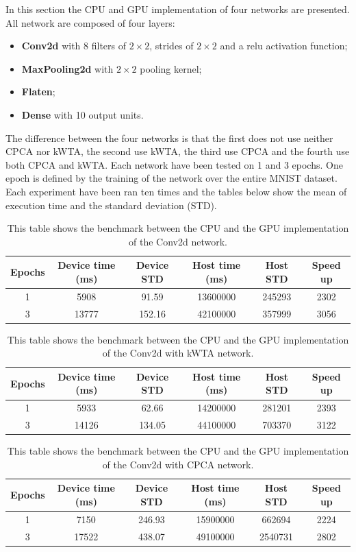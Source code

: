 \documentclass[11pt]{report}
\begin{document}
In this section the CPU and GPU implementation of four networks are presented. All network are composed of four layers:

\begin{itemize}
	\item \textbf{Conv2d} with 8 filters of $2\times2$, strides of $2\times2$ and a relu activation function;
	\item \textbf{MaxPooling2d} with $2\times2$ pooling kernel;
	\item \textbf{Flaten};
	\item \textbf{Dense} with 10 output units.
\end{itemize}

\noindent The difference between the four networks is that the first does not use neither CPCA nor kWTA, the second use kWTA, the third use CPCA and the fourth use both CPCA and kWTA. Each network have been tested on 1 and 3 epochs. One epoch is defined by the training of the network over the entire MNIST dataset. Each experiment have been ran ten times and the tables below show the mean of execution time and the standard deviation (STD).

\begin{table}[h!]
\centering
\begin{tabular}{ c c c c c c }
Epochs & Device time (ms) & Device STD & Host time (ms) & Host STD & Speed up\\
\hline
1 & 5908  & 91.59  & 13600000 & 245293 & 2302 \\
3 & 13777 & 152.16 & 42100000 & 357999 & 3056
\end{tabular}
\caption[Speed benchmark: Conv2d network]{This table shows the benchmark between the CPU and the GPU implementation of the Conv2d network.}
\end{table}

\begin{table}[h!]
\centering
\begin{tabular}{ c c c c c c }
Epochs & Device time (ms) & Device STD & Host time (ms) & Host STD & Speed up\\
\hline
1 & 5933  & 62.66  & 14200000 & 281201 & 2393 \\
3 & 14126 & 134.05 & 44100000 & 703370 & 3122
\end{tabular}
\caption[Speed benchmark: Conv2d network with kWTA]{This table shows the benchmark between the CPU and the GPU implementation of the Conv2d with kWTA network.}
\end{table}

\begin{table}[h!]
\centering
\begin{tabular}{ c c c c c c }
Epochs & Device time (ms) & Device STD & Host time (ms) & Host STD & Speed up\\
\hline
1 & 7150  & 246.93 & 15900000 & 662694  & 2224 \\
3 & 17522 & 438.07 & 49100000 & 2540731 & 2802
\end{tabular}
\caption[Speed benchmark: Conv2d network with CPCA]{This table shows the benchmark between the CPU and the GPU implementation of the Conv2d with CPCA network.}
\end{table}
\end{document}
